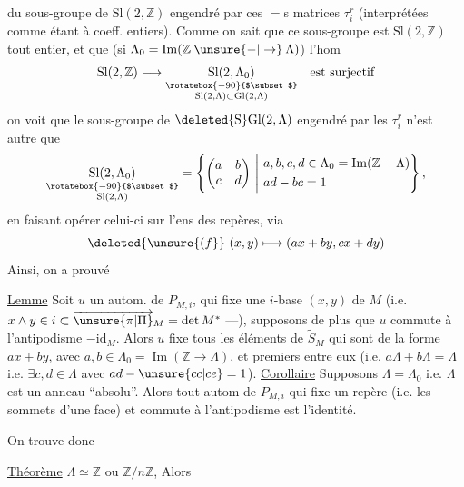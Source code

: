 du sous-groupe de $\mathrm{Sl}(2,\mathbb Z)$ engendré par ces $=$s matrices $\tau_i^r$ (interprétées comme étant à
coeff. entiers). Comme on sait que ce sous-groupe est $\mathrm{Sl}(2,\mathbb Z)$ tout entier, et que (si $\Lambda_0=\operatorname{Im}(\mathbb Z\mathbin{\unsure{-|\to}}\Lambda)$)  l'hom
\[
 \mathrm{Sl}(2,\mathbb Z)\longrightarrow
 \underset{\substack{\rotatebox{-90}{$\subset$}\\\mathrm{Sl}(2,\Lambda)\subset\mathrm{Gl}(2,\Lambda)}}{\mathrm{Sl}(2,\Lambda_0)}
 \quad\text{est surjectif}
\]
on voit que le sous-groupe de $\mathrm{\deleted{S}Gl}(2,\Lambda)$ engendré par les $\tau_i^{r}$ n'est autre que  \unsure{/}
\[
 \underset{\substack{\rotatebox{-90}{$\subset$}\\\mathrm{Sl}(2,\Lambda)}}{\mathrm{Sl}(2,\Lambda_0)}
 =\left\{\begin{pmatrix}a&b\\c&d\end{pmatrix}\ \middle|\
 \begin{aligned}&a,b,c,d\in\Lambda_0=\operatorname{Im}(\mathbb Z\mathbin{-}\Lambda)\\&ad-bc=1\end{aligned}\right\},
\]
en faisant opérer celui-ci  sur l'ens des repères, via
\[
 \deleted{\unsure{(f}}\ (x,y)\longmapsto(ax+by,cx+dy)
\]
Ainsi, on a prouvé

\uline{Lemme} Soit $u$ un autom. de $P_{M,i}$, qui fixe  une $i$-base $(x,y)$ de $M$ (i.e. $x\wedge y\in i\subset\overrightarrow{\unsure{\pi|\Pi}}_M=\det M^*$ ---),  supposons de plus que $u$ commute à l'antipodisme $-\mathrm{id}_M$. Alors $u$ fixe  tous les éléments de $\widetilde S_M$ qui sont de la forme $ax+by$, avec $a,b\in\Lambda_0=\operatorname{Im}(\mathbb Z\to\Lambda)$, et premiers  entre eux (i.e. $a\Lambda+b\Lambda=\Lambda$ i.e. $\exists c,d\in\Lambda$ avec $ad-\unsure{cc|ce}=1$).
\uline{Corollaire} Supposons $\Lambda=\Lambda_0$ i.e. $\Lambda$ est un anneau ``absolu''. Alors tout autom de $P_{M,i}$ qui fixe un repère (i.e. les sommets d'une face) et commute à l'antipodisme est l'identité.

On trouve donc

\uline{Théorème}  $\Lambda\simeq\mathbb Z$ ou $\mathbb Z/n\mathbb Z$,  Alors

